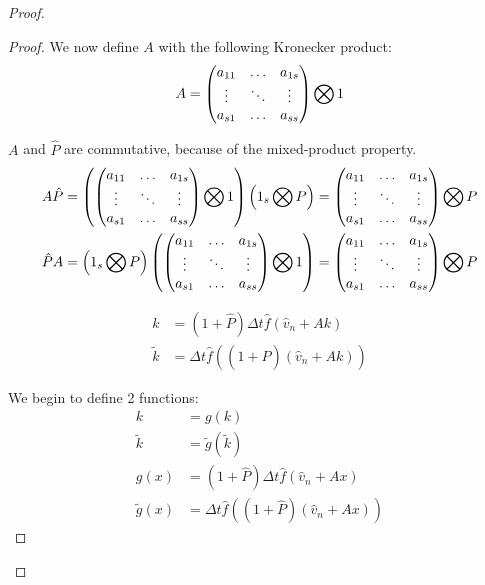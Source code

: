 \begin{proof}
\begin{proof}
We now define $A$ with the following Kronecker product:
\begin{equation}
 A=\begin{pmatrix}
    a_{11}	&\ldots	&a_{1s}\\
    \vdots	&\ddots	&\vdots\\
    a_{s1}	&\ldots	&a_{ss}\\
   \end{pmatrix} \bigotimes 1
\end{equation}

$A$ and $\hat{P}$ are commutative, because of the mixed-product property.
\begin{align}
A\hat{P}&=\left(\begin{pmatrix}
    a_{11}	&\ldots	&a_{1s}\\
    \vdots	&\ddots	&\vdots\\
    a_{s1}	&\ldots	&a_{ss}\\
   \end{pmatrix} \bigotimes 1 \right)
   \left(1_{s}\bigotimes P\right)=
         \begin{pmatrix}
    a_{11}	&\ldots	&a_{1s}\\
    \vdots	&\ddots	&\vdots\\
    a_{s1}	&\ldots	&a_{ss}\\
    \end{pmatrix}\bigotimes P\\
    \hat{P}A&=
   \left(1_{s}\bigotimes P\right)
         \left(\begin{pmatrix}
    a_{11}	&\ldots	&a_{1s}\\
    \vdots	&\ddots	&\vdots\\
    a_{s1}	&\ldots	&a_{ss}\\
   \end{pmatrix} \bigotimes 1 \right)=
         \begin{pmatrix}
    a_{11}	&\ldots	&a_{1s}\\
    \vdots	&\ddots	&\vdots\\
    a_{s1}	&\ldots	&a_{ss}\\
    \end{pmatrix}\bigotimes P
\end{align}

\begin{align}
 k&=(1+\hat{P})\Delta t\hat{f}(\hat{v}_{n}+Ak)\\
 \tilde{k}&=\Delta t \hat{f}((1+\hat{P})(\hat{v}_{n}+Ak))
\end{align}

We begin to define 2 functions:
\begin{align}
 k&=g(k)\\
 \tilde{k}&=\tilde{g}(\tilde{k})\\
 g(x)&=(1+\hat{P})\Delta t \hat{f}(\hat{v}_{n}+Ax)\\
 \tilde{g}(x)&=\Delta t \hat{f}((1+\hat{P})(\hat{v}_{n}+Ax))
\end{align}


\end{proof}
\end{proof}
